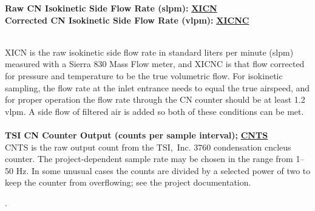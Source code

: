 \begin{hangparagraphs}
\begin{minipage}[t]{1\columnwidth}%
\textbf{Raw CN Isokinetic Side Flow Rate (slpm): }\textbf{\uline{XICN}}\\
\textbf{Corrected CN Isokinetic Side Flow Rate (vlpm): }\textbf{\uline{XICNC}}%
\end{minipage}\\
XICN is the raw isokinetic side flow rate in standard liters per minute
(slpm) measured with a Sierra 830 Mass Flow meter, and XICNC is that
flow corrected for pressure and temperature to be the true volumetric
flow. For isokinetic sampling, the flow rate at the inlet entrance
needs to equal the true airspeed, and for proper operation the flow
rate through the CN counter should be at least 1.2 vlpm. A side flow
of filtered air is added so both of these conditions can be met.\\
\\


\textbf{TSI CN Counter Output (counts per sample interval); }\textbf{\uline{CNTS}}\\
CNTS is the raw output count from the TSI,~Inc. 3760 condensation
cncleus counter. The project-dependent sample rate may be chosen in
the range from 1--50 Hz. In some unusual cases the counts are divided
by a selected power of two to keep the counter from overflowing; see
the project documentation. 

.


\end{hangparagraphs}
